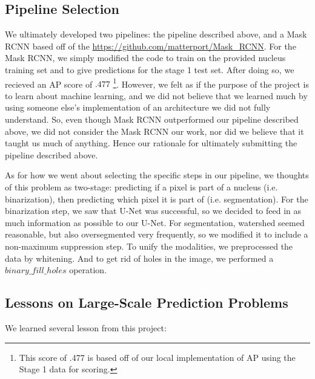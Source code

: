\documentclass[paper=letter, fontsize=12pt]{article}
\numberwithin{equation}{section} %
\numberwithin{figure}{section} %
\numberwithin{table}{section} %
\begin{document}
\subsection{ Pipeline Selection }

We ultimately developed two pipelines: the pipeline described above, and a Mask
RCNN based off of the \href{Matterport
Implementation}{https://github.com/matterport/Mask\_RCNN}.  For the Mask RCNN,
we simply modified the code to train on the provided nucleus training set and
to give predictions for the stage 1 test set. After doing so, we recieved an AP
score of $.477$ \footnote{This score of .477 is based off of our local
implementation of AP using the Stage 1 data for scoring.}. However, we felt as
if the purpose of the project is to learn about machine learning, and we did
not believe that we learned much by using someone else's implementation of an
architecture we did not fully understand.  So, even though Mask RCNN
outperformed our pipeline described above, we did not consider the Mask RCNN
our work, nor did we believe that it taught us much of anything. Hence our
rationale for ultimately submitting the pipeline described above.

As for how we went about selecting the specific steps in our pipeline, we
thoughts of this problem as two-stage: predicting if a pixel is part of a
nucleus (i.e. binarization), then predicting which pixel it is part of (i.e.
segmentation).  For the binarization step, we saw that U-Net was successful, so
we decided to feed in as much information as possible to our U-Net. For
segmentation, watershed seemed reasonable, but also oversegmented very
frequently, so we modified it to include a non-maximum suppression step. To
unify the modalities, we preprocessed the data by whitening. And to get rid of
holes in the image, we performed a \texttt{$binary\_fill\_holes$} operation.

\subsection{ Lessons on Large-Scale Prediction Problems }

We learned several lesson from this project:
\end{document}
